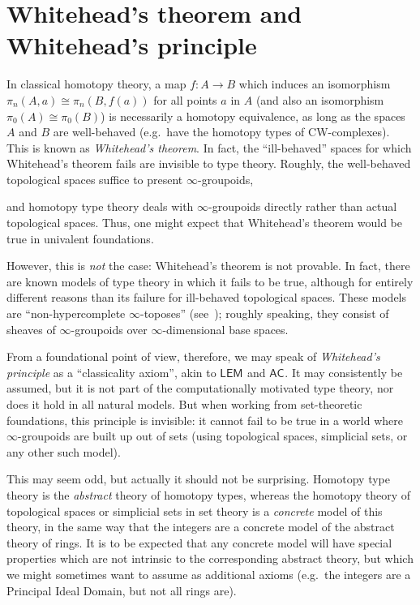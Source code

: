 \documentclass[10pt,a4paper]{article}
\providecommand{\index}[1]{}
\theoremstyle{definition}
\theoremstyle{remark}
\numberwithin{equation}{section}
\newcommand{\LEM}[1]{\ensuremath{\mathsf{LEM}_{#1}}\xspace}
\newcommand{\choice}[1]{\ensuremath{\mathsf{AC}_{#1}}\xspace}
\begin{document}
\section{Whitehead's theorem and Whitehead's principle}
\label{sec:whitehead}

In classical homotopy theory, a map $f:A\to B$ which induces an isomorphism $\pi_n(A,a) \cong \pi_n(B,f(a))$ for all points $a$ in $A$ (and also an isomorphism $\pi_0(A)\cong\pi_0(B)$) is necessarily a homotopy equivalence, as long as the spaces $A$ and $B$ are well-behaved (e.g.\ have the homotopy types of CW-complexes).
\index{theorem!Whitehead's}%
\index{Whitehead's!theorem}%
This is known as \emph{Whitehead's theorem}.
In fact, the ``ill-behaved'' spaces for which Whitehead's theorem fails are invisible to type theory.
Roughly, the well-behaved topological spaces suffice to present $\infty$-groupoids,%
\index{.infinity-groupoid@$\infty$-groupoid}
and homotopy type theory deals with $\infty$-groupoids directly rather than actual topological spaces.
Thus, one might expect that Whitehead's theorem would be true in univalent foundations.

However, this is \emph{not} the case: Whitehead's theorem is not provable.
In fact, there are known models of type theory in which it fails to be true, although for entirely different reasons than its failure for ill-behaved topological spaces.
These models are ``non-hypercomplete $\infty$-toposes''
\index{.infinity1-topos@$(\infty,1)$-topos}%
\index{.infinity1-topos@$(\infty,1)$-topos!non-hypercomplete}%
(see~\cite{lurie:higher-topoi}); roughly speaking, they consist of sheaves of $\infty$-groupoids over $\infty$-dimensional base spaces.

\index{axiom!Whitehead's principle|(}%
\index{Whitehead's!principle|(}%

From a foundational point of view, therefore, we may speak of \emph{Whitehead's principle} as a ``classicality axiom'', akin to \LEM{} and \choice{}.
It may consistently be assumed, but it is not part of the computationally motivated type theory, nor does it hold in all natural models.
But when working from set-theoretic foundations, this principle is invisible: it cannot fail to be true in a world where $\infty$-groupoids are built up out of sets (using topological spaces, simplicial sets, or any other such model).

This may seem odd, but actually it should not be surprising.
Homotopy type theory is the \emph{abstract} theory of homotopy types, whereas the homotopy theory of topological spaces or simplicial sets in set theory is a \emph{concrete} model of this theory, in the same way that the integers are a concrete model of the abstract theory of rings.
It is to be expected that any concrete model will have special properties which are not intrinsic to the corresponding abstract theory, but which we might sometimes want to assume as additional axioms (e.g.\ the integers are a Principal Ideal Domain, but not all rings are).
\end{document}
